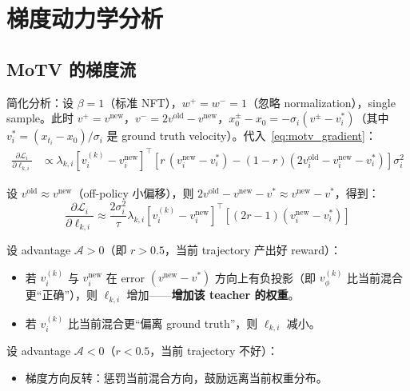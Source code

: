 \documentclass[11pt,a4paper]{article}
\newcommand{\loss}{\mathcal{L}}
\newcommand{\vphi}{v_\phi}
\newcommand{\adv}{\mathcal{A}}
\theoremstyle{definition}
\begin{document}
\section{梯度动力学分析}
\label{sec:dynamics}

\subsection{MoTV 的梯度流}

简化分析：设 $\beta = 1$（标准 NFT），$w^+ = w^- = 1$（忽略 normalization），single sample。此时 $v^+ = v^{\mathrm{new}}$，$v^- = 2v^{\mathrm{old}} - v^{\mathrm{new}}$，$x_0^\pm - x_0 = -\sigma_i(v^\pm - v^*_i)$（其中 $v^*_i = (x_{t_i} - x_0)/\sigma_i$ 是 ground truth velocity）。代入~\eqref{eq:motv_gradient}：
\begin{align}
\frac{\partial \loss_i}{\partial \ell_{k,i}} &\propto \lambda_{k,i}\left[v^{(k)}_i - v^{\mathrm{new}}_i\right]^\top \left[r\,(v^{\mathrm{new}}_i - v^*_i) - (1-r)(2v^{\mathrm{old}}_i - v^{\mathrm{new}}_i - v^*_i)\right]\sigma_i^2
\end{align}

设 $v^{\mathrm{old}} \approx v^{\mathrm{new}}$（off-policy 小偏移），则 $2v^{\mathrm{old}} - v^{\mathrm{new}} - v^* \approx v^{\mathrm{new}} - v^*$，得到：
\begin{equation}
\frac{\partial \loss_i}{\partial \ell_{k,i}} \approx \frac{2\sigma_i^2}{\tau} \lambda_{k,i}\left[v^{(k)}_i - v^{\mathrm{new}}_i\right]^\top \left[(2r-1)(v^{\mathrm{new}}_i - v^*_i)\right]
\label{eq:simplified_grad}
\end{equation}

\begin{tcolorbox}[colback=green!5, colframe=green!50, title=梯度解读]
设 advantage $\adv > 0$（即 $r > 0.5$，当前 trajectory 产出好 reward）：
\begin{itemize}
\item 若 $v^{(k)}_i$ 与 $v^{\mathrm{new}}_i$ 在 error $(v^{\mathrm{new}} - v^*)$ 方向上有负投影（即 $\vphi^{(k)}$ 比当前混合更``正确''），则 $\ell_{k,i}$ 增加——\textbf{增加该 teacher 的权重}。
\item 若 $v^{(k)}_i$ 比当前混合更``偏离 ground truth''，则 $\ell_{k,i}$ 减小。
\end{itemize}

设 advantage $\adv < 0$（$r < 0.5$，当前 trajectory 不好）：
\begin{itemize}
\item 梯度方向反转：惩罚当前混合方向，鼓励远离当前权重分布。
\end{itemize}
\end{tcolorbox}
\end{document}
